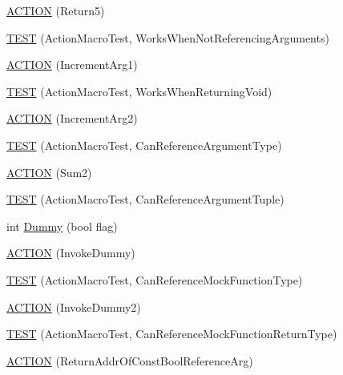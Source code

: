 \begin{DoxyCompactItemize}
\item 
\hyperlink{namespacetesting_1_1gmock__generated__actions__test_a1275b0757e9f1caf70fbc23da141acd3}{A\+C\+T\+I\+ON} (Return5)
\item 
\hyperlink{namespacetesting_1_1gmock__generated__actions__test_a6a73da775945f4294d9377b0110bb237}{T\+E\+ST} (Action\+Macro\+Test, Works\+When\+Not\+Referencing\+Arguments)
\item 
\hyperlink{namespacetesting_1_1gmock__generated__actions__test_a960f5a5ca2b6a95ce1f3f1673b90d02d}{A\+C\+T\+I\+ON} (Increment\+Arg1)
\item 
\hyperlink{namespacetesting_1_1gmock__generated__actions__test_accde1673541c5076b0e09b3f1914c9d2}{T\+E\+ST} (Action\+Macro\+Test, Works\+When\+Returning\+Void)
\item 
\hyperlink{namespacetesting_1_1gmock__generated__actions__test_aa2c56f5c6a770b252ebdc27a6d8b613d}{A\+C\+T\+I\+ON} (Increment\+Arg2)
\item 
\hyperlink{namespacetesting_1_1gmock__generated__actions__test_abdfd8146dfbb5a152326a851b13e45cb}{T\+E\+ST} (Action\+Macro\+Test, Can\+Reference\+Argument\+Type)
\item 
\hyperlink{namespacetesting_1_1gmock__generated__actions__test_a108b4ee75c3b13445b7035fd5ecd6d6d}{A\+C\+T\+I\+ON} (Sum2)
\item 
\hyperlink{namespacetesting_1_1gmock__generated__actions__test_a4e2d8b9ac63b2f6dc6d4b17c3a767dee}{T\+E\+ST} (Action\+Macro\+Test, Can\+Reference\+Argument\+Tuple)
\item 
int \hyperlink{namespacetesting_1_1gmock__generated__actions__test_ab91824b86c842e024337b6de45eb8cdc}{Dummy} (bool flag)
\item 
\hyperlink{namespacetesting_1_1gmock__generated__actions__test_ae6806220035fcf097362dd736db4b03b}{A\+C\+T\+I\+ON} (Invoke\+Dummy)
\item 
\hyperlink{namespacetesting_1_1gmock__generated__actions__test_a1d3b8bb25c79d7e2167234f87935ea1e}{T\+E\+ST} (Action\+Macro\+Test, Can\+Reference\+Mock\+Function\+Type)
\item 
\hyperlink{namespacetesting_1_1gmock__generated__actions__test_a9f274ffcf4211cb03b4390cb0cc1ef1c}{A\+C\+T\+I\+ON} (Invoke\+Dummy2)
\item 
\hyperlink{namespacetesting_1_1gmock__generated__actions__test_a384a114235b474bb4318754e0d16f559}{T\+E\+ST} (Action\+Macro\+Test, Can\+Reference\+Mock\+Function\+Return\+Type)
\item 
\hyperlink{namespacetesting_1_1gmock__generated__actions__test_a78725817afcd5d7f19df2bdc2d41b9db}{A\+C\+T\+I\+ON} (Return\+Addr\+Of\+Const\+Bool\+Reference\+Arg)

\end{DoxyCompactItemize}
